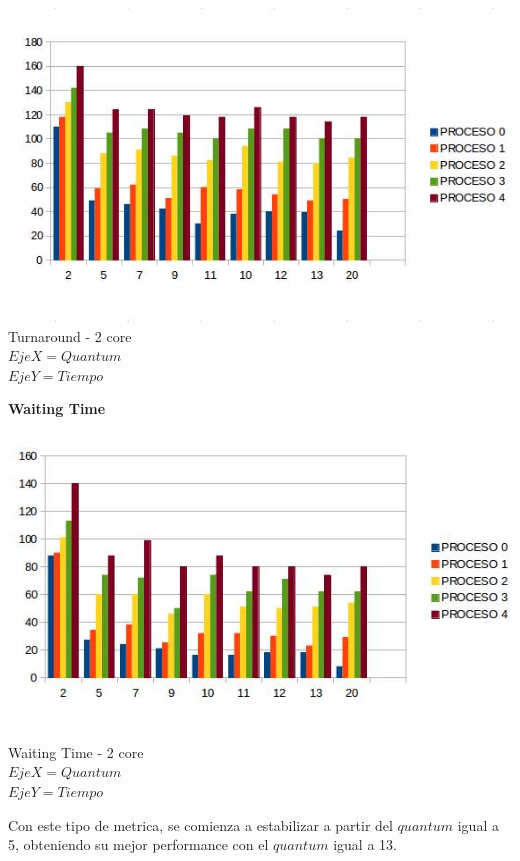   
 \begin{center}
    	\includegraphics[width=1\textwidth]{./EJ7/tour2core.png}
	{Turnaround - 2 core}	\\
	{$Eje X = Quantum$\\$ Eje Y = Tiempo$}\\
 \end{center} 
 
 \begin{center}
  \textbf{Waiting Time}
 \end{center}

  \begin{center}
    	\includegraphics[width=1\textwidth]{./EJ7/waiting2core.jpg}
	{Waiting Time - 2 core}	\\
	{$Eje X = Quantum$\\$Eje Y = Tiempo$}\\
 \end{center} 
 
 \indent Con este tipo de metrica, se comienza a estabilizar a partir del $quantum$ igual a 5, obteniendo su mejor
 performance con el $quantum$ igual a 13.\\
 
